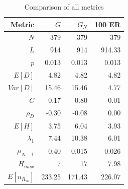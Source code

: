 \documentclass{article}
\begin{document}
\begin{table}[H]
  \centering
  \begin{tabular}{r|rrr}
    \toprule
    Metric            & $G$    & $G_N$  & 100 ER \\
    \midrule
    $N$               & 379    & 379    & 379    \\
    $L$               & 914    & 914    & 914.33 \\
    $p$               & 0.013  & 0.013  & 0.013  \\
    $E[D]$            & 4.82   & 4.82   & 4.82   \\
    $Var[D]$          & 15.46  & 15.46  & 4.77   \\
    $C$               & 0.17   & 0.80   & 0.01   \\
    $\rho_D$          & -0.30  & -0.08  & 0.00   \\
    $E[H]$            & 3.75   & 6.04   & 3.93   \\
    $\lambda_1$       & 7.44   & 10.38  & 6.01   \\
    $\mu_{N-1}$       & 0.40   & 0.015  & 0.026  \\
    $H_{max}$         & 7      & 17     & 7.98   \\
    $E[n_{R_\infty}]$ & 233.25 & 171.43 & 226.07 \\
    \bottomrule
  \end{tabular}
  \caption{Comparison of all metrics}
\end{table}
\end{document}

